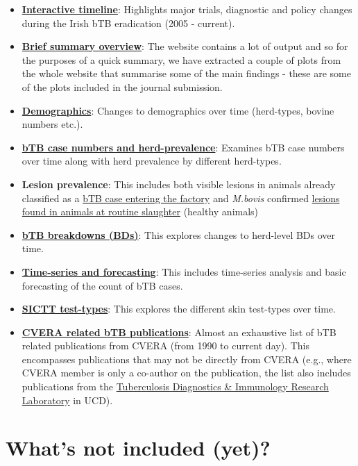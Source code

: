 \documentclass[
  letterpaper,
  DIV=11,
  numbers=noendperiod]{scrreprt}
\providecommand{\tightlist}{%
  \setlength{\itemsep}{0pt}\setlength{\parskip}{0pt}}
\begin{document}
\begin{itemize}
\tightlist
\item
  \hyperref[sec-timeline]{\textbf{Interactive timeline}}: Highlights
  major trials, diagnostic and policy changes during the Irish bTB
  eradication (2005 - current).
\item
  \hyperref[sec-summary]{\textbf{Brief summary overview}}: The website
  contains a lot of output and so for the purposes of a quick summary,
  we have extracted a couple of plots from the whole website that
  summarise some of the main findings - these are some of the plots
  included in the journal submission.
\item
  \hyperref[sec-demographics]{\textbf{Demographics}}: Changes to
  demographics over time (herd-types, bovine numbers etc.).
\item
  \hyperref[sec-casenumbers]{\textbf{bTB case numbers and
  herd-prevalence}}: Examines bTB case numbers over time along with herd
  prevalence by different herd-types.
\item
  \textbf{Lesion prevalence}: This includes both visible lesions in
  animals already classified as a \hyperref[sec-btblesions]{bTB case
  entering the factory} and \emph{M.bovis} confirmed
  \hyperref[sec-healthlylesion]{lesions found in animals at routine
  slaughter} (healthy animals)
\item
  \hyperref[sec-breakdown]{\textbf{bTB breakdowns (BDs)}}: This explores
  changes to herd-level BDs over time.
\item
  \hyperref[sec-timeseries]{\textbf{Time-series and forecasting}}: This
  includes time-series analysis and basic forecasting of the count of
  bTB cases.
\item
  \hyperref[sec-testtypes]{\textbf{SICTT test-types}}: This explores the
  different skin test-types over time.
\item
  \hyperref[sec-publications]{\textbf{CVERA related bTB publications}}:
  Almost an exhaustive list of bTB related publications from CVERA (from
  1990 to current day). This encompasses publications that may not be
  directly from CVERA (e.g., where CVERA member is only a co-author on
  the publication, the list also includes publications from the
  \href{https://www.ucd.ie/vetmed/research/researchthemes/veterinaryepidemiologyandnationaldiseasecontrol/}{Tuberculosis
  Diagnostics \& Immunology Research Laboratory} in UCD).
\end{itemize}

\section*{What's not included (yet)?}\label{whats-not-included-yet}
\end{document}
